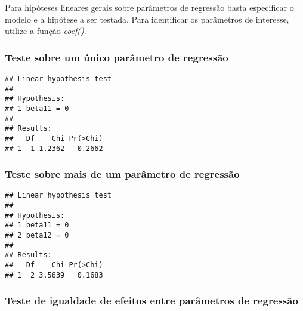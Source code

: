 Para hipóteses lineares gerais sobre parâmetros de regressão basta especificar o modelo e a hipótese a ser testada. Para identificar os parâmetros de interesse, utilize a função \emph{coef()}.

\subsubsection{Teste sobre um único parâmetro de regressão}

\begin{knitrout}
\color{fgcolor}\begin{kframe}
\begin{alltt}
\hlstd{(} 
                      \hlstd{=} \hlstd{(}\hlstd{))}
\end{alltt}
\begin{verbatim}
## Linear hypothesis test
## 
## Hypothesis:            
## 1 beta11 = 0
## 
## Results:
##   Df    Chi Pr(>Chi)
## 1  1 1.2362   0.2662
\end{verbatim}
\end{kframe}
\end{knitrout}

\subsubsection{Teste sobre mais de um parâmetro de regressão}

\begin{knitrout}
\color{fgcolor}\begin{kframe}
\begin{alltt}
\hlstd{(} 
                      \hlstd{=} \hlstd{(}\hlstd{,}
                                    \hlstd{))}
\end{alltt}
\begin{verbatim}
## Linear hypothesis test
## 
## Hypothesis:            
## 1 beta11 = 0
## 2 beta12 = 0
## 
## Results:
##   Df    Chi Pr(>Chi)
## 1  2 3.5639   0.1683
\end{verbatim}
\end{kframe}
\end{knitrout}

\subsubsection{Teste de igualdade de efeitos entre parâmetros de regressão}

